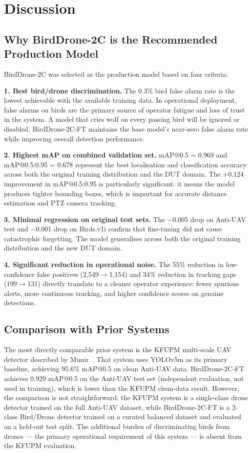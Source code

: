 \documentclass[12pt,a4paper]{report}
\begin{document}
\chapter{Discussion}

\section{Why BirdDrone-2C is the Recommended Production Model}

BirdDrone-2C was selected as the production model based on four criteria:

\textbf{1. Best bird/drone discrimination.} The 0.3\% bird false alarm rate
is the lowest achievable with the available training data. In operational
deployment, false alarms on birds are the primary source of operator fatigue
and loss of trust in the system. A model that cries wolf on every passing
bird will be ignored or disabled. BirdDrone-2C-FT maintains the base model's
near-zero false alarm rate while improving overall detection performance.

\textbf{2. Highest mAP on combined validation set.} mAP@0.5 = 0.969 and
mAP@0.5:0.95 = 0.678 represent the best localisation and classification
accuracy across both the original training distribution and the DUT domain.
The +0.124 improvement in mAP@0.5:0.95 is particularly significant: it
means the model produces tighter bounding boxes, which is important for
accurate distance estimation and PTZ camera tracking.

\textbf{3. Minimal regression on original test sets.} The $-$0.005 drop on
Anti-UAV test and $-$0.001 drop on Birds.v1i confirm that fine-tuning did
not cause catastrophic forgetting. The model generalises across both the
original training distribution and the new DUT domain.

\textbf{4. Significant reduction in operational noise.} The 55\% reduction
in low-confidence false positives (2,549$\to$1,154) and 34\% reduction in
tracking gaps (199$\to$131) directly translate to a cleaner operator
experience: fewer spurious alerts, more continuous tracking, and higher
confidence scores on genuine detections.

\section{Comparison with Prior Systems}

The most directly comparable prior system is the KFUPM multi-scale UAV
detector described by Munir~\cite{munir2023kfupm}. That system uses
YOLOv5m as its primary baseline, achieving 95.6\% mAP@0.5 on clean
Anti-UAV data. BirdDrone-2C-FT achieves 0.929 mAP@0.5 on the Anti-UAV
test set (independent evaluation, not used in training), which is lower
than the KFUPM clean-data result. However, the comparison is not
straightforward: the KFUPM system is a single-class drone detector
trained on the full Anti-UAV dataset, while BirdDrone-2C-FT is a
2-class Bird/Drone detector trained on a curated balanced dataset and
evaluated on a held-out test split. The additional burden of
discriminating birds from drones --- the primary operational requirement
of this system --- is absent from the KFUPM evaluation.
\end{document}
